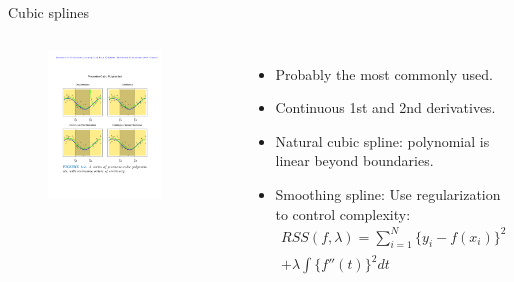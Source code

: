 \documentclass[aspectratio=169]{beamer}
\begin{document}
\begin{frame}{Cubic splines}
    \begin{columns}
    \begin{figure}
        \centering
        \includegraphics[width=0.8\textwidth]{figures/piecewisecubic.pdf}
    \end{figure}
    \begin{itemize}
        \item Probably the most commonly used.
        \item Continuous 1st and 2nd derivatives.
        \item Natural cubic spline: polynomial is linear beyond boundaries.
        \item Smoothing spline: Use  regularization to control complexity:
        \begin{eqnarray*}
            RSS(f, \lambda) = \sum_{i=1}^N \{y_i - f(x_i)\} ^ 2 \\
            + \lambda \int \{f''(t)\}^2 dt
        \end{eqnarray*}
    \end{itemize}
    \end{columns}
\end{frame}
\end{document}
